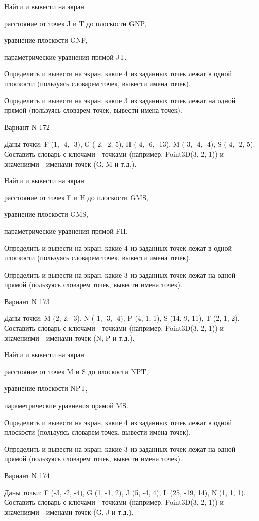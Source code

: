 \documentclass[11pt]{report}
\begin{document}
Найти и вывести на экран


расстояние от точек J и T до плоскости GNP,


уравнение плоскости GNP,


параметрические уравнения прямой JT.


Определить и вывести на экран, какие 4 из заданных точек лежат в одной плоскости (пользуясь словарем точек, вывести имена точек).


Определить и вывести на экран, какие 3 из заданных точек лежат на одной прямой (пользуясь словарем точек, вывести имена точек).

\newpage
Вариант N 172

Даны точки: F (1, -4, -3), G (-2, -2, 5), H (-4, -6, -13), M (-3, -4, -4), S (-4, -2, 5).
Составить словарь с ключами - точками (например, Point3D(3, 2, 1)) и значениями - именами точек (G, M и т.д.).


Найти и вывести на экран


расстояние от точек F и H до плоскости GMS,


уравнение плоскости GMS,


параметрические уравнения прямой FH.


Определить и вывести на экран, какие 4 из заданных точек лежат в одной плоскости (пользуясь словарем точек, вывести имена точек).


Определить и вывести на экран, какие 3 из заданных точек лежат на одной прямой (пользуясь словарем точек, вывести имена точек).

\newpage
Вариант N 173

Даны точки: M (2, 2, -3), N (-1, -3, -4), P (4, 1, 1), S (14, 9, 11), T (2, 1, 2).
Составить словарь с ключами - точками (например, Point3D(3, 2, 1)) и значениями - именами точек (N, P и т.д.).


Найти и вывести на экран


расстояние от точек M и S до плоскости NPT,


уравнение плоскости NPT,


параметрические уравнения прямой MS.


Определить и вывести на экран, какие 4 из заданных точек лежат в одной плоскости (пользуясь словарем точек, вывести имена точек).


Определить и вывести на экран, какие 3 из заданных точек лежат на одной прямой (пользуясь словарем точек, вывести имена точек).

\newpage
Вариант N 174

Даны точки: F (-3, -2, -4), G (1, -1, 2), J (5, -4, 4), L (25, -19, 14), N (1, 1, 1).
Составить словарь с ключами - точками (например, Point3D(3, 2, 1)) и значениями - именами точек (G, J и т.д.).
\end{document}
